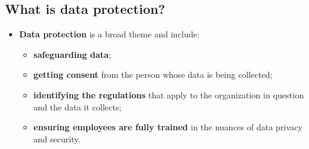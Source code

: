 \documentclass[9pt, letterpaper]{article}
\begin{document}
\subsection{What is data protection?}
\begin{itemize}
	\item \textbf{Data protection} is a broad theme and include:
	      \begin{itemize}
		      \item \textbf{safeguarding data};
		      \item \textbf{getting consent} from the person whose data is being collected;
		      \item \textbf{identifying the regulations} that apply to the organization in question and the data it collects;
		      \item \textbf{ensuring employees are fully trained} in the nuances of data privacy and security.
	      \end{itemize}
\end{itemize}
\end{document}
